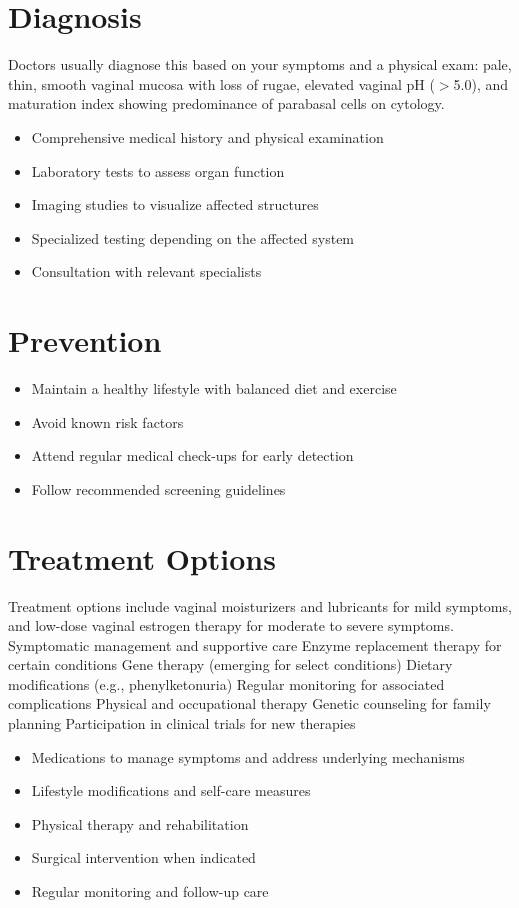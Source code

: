 \section{Diagnosis}
Doctors usually diagnose this based on your symptoms and a physical exam: pale, thin, smooth vaginal mucosa with loss of rugae, elevated vaginal pH ($>$5.0), and maturation index showing predominance of parabasal cells on cytology.

\begin{itemize}[noitemsep]
  \item Comprehensive medical history and physical examination
  \item Laboratory tests to assess organ function
  \item Imaging studies to visualize affected structures
  \item Specialized testing depending on the affected system
  \item Consultation with relevant specialists
\end{itemize}
\section{Prevention}
\begin{itemize}[noitemsep]
  \item Maintain a healthy lifestyle with balanced diet and exercise
  \item Avoid known risk factors
  \item Attend regular medical check-ups for early detection
  \item Follow recommended screening guidelines
\end{itemize}
\section{Treatment Options}
Treatment options include vaginal moisturizers and lubricants for mild symptoms, and low-dose vaginal estrogen therapy for moderate to severe symptoms. Symptomatic management and supportive care Enzyme replacement therapy for certain conditions Gene therapy (emerging for select conditions) Dietary modifications (e.g., phenylketonuria) Regular monitoring for associated complications Physical and occupational therapy Genetic counseling for family planning Participation in clinical trials for new therapies

\begin{itemize}[noitemsep]
  \item Medications to manage symptoms and address underlying mechanisms
  \item Lifestyle modifications and self-care measures
  \item Physical therapy and rehabilitation
  \item Surgical intervention when indicated
  \item Regular monitoring and follow-up care
\end{itemize}
